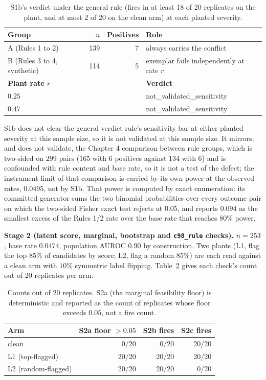 \begin{table}[H]
\caption[C102 Stage 1, S1b verdicts]{S1b's verdict under the general rule (fires
in at least 18 of 20 replicates on the plant, and at most 2 of 20 on the clean
arm) at each planted severity.}
\centering
\begin{tabular}{lrrl}
\toprule
\textbf{Group} & \textbf{$n$} & \textbf{Positives} & \textbf{Role} \\
\midrule
A (Rules 1 to 2)          & 139 & 7 & always carries the conflict \\
B (Rules 3 to 4, synthetic) & 114 & 5 & exemplar fails independently at rate $r$ \\
\midrule
\textbf{Plant rate $r$} & & & \textbf{Verdict} \\
\midrule
$0.25$ & & & not\_validated\_sensitivity \\
$0.47$ & & & not\_validated\_sensitivity \\
\bottomrule
\end{tabular}
\label{sup:tab:s5-c102-s1}
\end{table}

S1b does not clear the general verdict rule's sensitivity bar at either
planted severity at this sample size, so it is not validated at this sample
size. It mirrors, and does not validate, the Chapter 4 comparison between rule groups,
which is two-sided on $299$ pairs ($165$ with $6$ positives against $134$ with $6$) and is
confounded with rule content and base rate, so it is not a test of the defect;
the instrument limit of that comparison is carried by its own power at the observed rates,
$0.0495$, not by S1b. That power is computed by exact enumeration: its committed generator sums
the two binomial probabilities over every outcome pair on which the two-sided Fisher exact test
rejects at $0.05$, and reports $0.094$ as the smallest excess of the Rules 1/2 rate over the base
rate that reaches $80\%$ power.

\textbf{Stage 2 (latent score, marginal, bootstrap and \texttt{c98\_rule}
checks).} $n=253$, base rate $0.0474$, population AUROC $0.90$ by
construction. Two plants (L1, flag the top $85\%$ of candidates by score;
L2, flag a random $85\%$) are each read against a clean arm with $10\%$
symmetric label flipping. Table~\ref{sup:tab:s5-c102-s2} gives each check's
count out of 20 replicates per arm.

\begin{table}[H]
\caption[C102 Stage 2 per-arm counts]{Counts out of 20 replicates. S2a (the
marginal feasibility floor) is deterministic and reported as the count of
replicates whose floor exceeds $0.05$, not a fire count.}
\centering
\begin{tabular}{lrrr}
\toprule
\textbf{Arm} & \textbf{S2a floor $>0.05$} & \textbf{S2b fires} & \textbf{S2c fires} \\
\midrule
clean & 0/20 & 0/20 & 20/20 \\
L1 (top-flagged)    & 20/20 & 20/20 & 20/20 \\
L2 (random-flagged) & 20/20 & 20/20 & 0/20 \\
\bottomrule
\end{tabular}
\label{sup:tab:s5-c102-s2}
\end{table}

